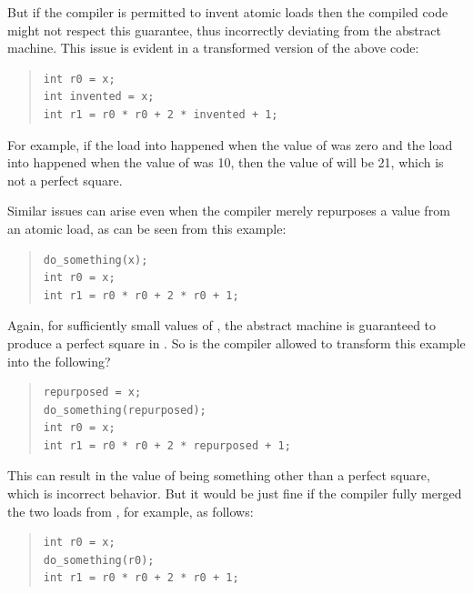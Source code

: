 \documentclass[10]{article}
\begin{document}
But if the compiler is permitted to invent atomic loads then the compiled
code might not respect this guarantee, thus incorrectly deviating
from the abstract machine.
This issue is evident in a transformed version of the above code:
\begin{quote}
\begin{verbatim}
int r0 = x;
int invented = x;
int r1 = r0 * r0 + 2 * invented + 1;
\end{verbatim}
\end{quote}
For example, if the load into  happened when the value of 
was zero and the load into  happened when the value of
 was 10, then the value of  will be 21, which is not
a perfect square.

Similar issues can arise even when the compiler merely repurposes a
value from an atomic load, as can be seen from this example:
\begin{quote}
\begin{verbatim}
do_something(x);
int r0 = x;
int r1 = r0 * r0 + 2 * r0 + 1;
\end{verbatim}
\end{quote}
Again, for sufficiently small values of , the abstract machine is
guaranteed to produce a perfect square in .
So is the compiler allowed to transform this example into the following?
\begin{quote}
\begin{verbatim}
repurposed = x;
do_something(repurposed);
int r0 = x;
int r1 = r0 * r0 + 2 * repurposed + 1;
\end{verbatim}
\end{quote}
This can result in the value of  being something other than
a perfect square, which is incorrect behavior.
%
But it would be just fine if the compiler fully merged the two loads from
, for example, as follows:
\begin{quote}
\begin{verbatim}
int r0 = x;
do_something(r0);
int r1 = r0 * r0 + 2 * r0 + 1;
\end{verbatim}
\end{quote}
\end{document}
